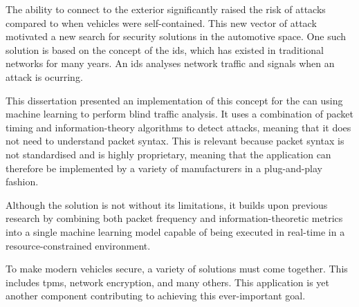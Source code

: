 The ability to connect to the exterior significantly raised the risk of attacks compared to when vehicles were self-contained. This new vector of attack motivated a new search for security solutions in the automotive space. One such solution is based on the concept of the \gls{ids}, which has existed in traditional networks for many years. An \gls{ids} analyses network traffic and signals when an attack is ocurring.\par

This dissertation presented an implementation of this concept for the \acrlong{can} using machine learning to perform blind traffic analysis. It uses a combination of packet timing and information-theory algorithms to detect attacks, meaning that it does not need to understand packet syntax. This is relevant because packet syntax is not standardised and is highly proprietary, meaning that the application can therefore be implemented by a variety of manufacturers in a plug-and-play fashion.\par

Although the solution is not without its limitations, it builds upon previous research by combining both packet frequency and information-theoretic metrics into a single machine learning model capable of being executed in real-time in a resource-constrained environment.\par

To make modern vehicles secure, a variety of solutions must come together. This includes \glspl{tpm}, network encryption, and many others. This application is yet another component contributing to achieving this ever-important goal.